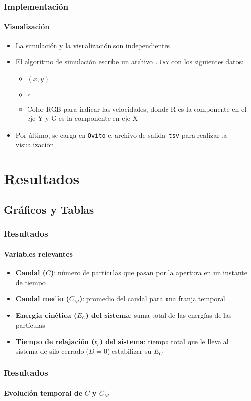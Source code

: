 \documentclass[hyperref={pdfpagelayout=SinglePage}]{beamer}
\begin{document}
\begin{frame}
\frametitle{Implementación}
\framesubtitle{Visualización}
\begin{itemize}
	\item La simulación y la visualización son independientes
	\item El algoritmo de simulación escribe un archivo \texttt{.tsv} con los siguientes datos:
	\begin{itemize}
		\item $(x,y)$
		\item $r$
		\item Color RGB para indicar las velocidades, donde R es la componente en el eje Y y G es la componente en eje X
	\end{itemize}
	\item Por último, se carga en \texttt{Ovito} el archivo de salida\texttt{.tsv} para realizar la visualización
\end{itemize}
\end{frame}

\section{Resultados}

\subsection{Gráficos y Tablas}

\begin{frame}
\frametitle{Resultados}
\framesubtitle{Variables relevantes}
\begin{itemize}
	\item \textbf{Caudal ($C$)}: número de partículas que pasan por la apertura en un instante de tiempo
	\item \textbf{Caudal medio ($C_{M}$)}: promedio del caudal para una franja temporal
	\item \textbf{Energía cinética ($E_{C}$) del sistema}: suma total de las energías de las partículas
	\item \textbf{Tiempo de relajación ($t_{r}$) del sistema}: tiempo total que le lleva al sistema de silo cerrado ($D = 0$) estabilizar su $E_{C}$
\end{itemize}
\end{frame}

\begin{frame}
\frametitle{Resultados}
\framesubtitle{Evolución temporal de $C$ y $C_{M}$}
\begin{center}
\begin{table}[h]
\centering
{}
\caption{Evolución temporal de $C$ y $C_{M}$}
\end{table}
\end{center}
\end{frame}
\end{document}
